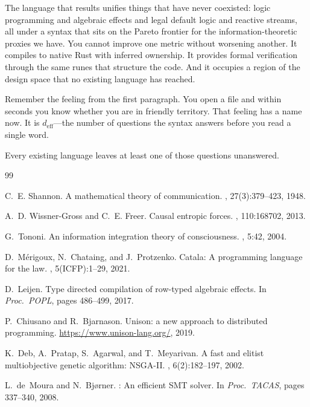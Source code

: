 \documentclass[11pt,a4paper]{article}
\newcommand{\deff}{d_{\mathrm{eff}}}
\begin{document}
The language that results unifies things that have never coexisted: logic programming and algebraic effects and legal default logic and reactive streams, all under a syntax that sits on the Pareto frontier for the information-theoretic proxies we have. You cannot improve one metric without worsening another. It compiles to native Rust with inferred ownership. It provides formal verification through the same runes that structure the code. And it occupies a region of the design space that no existing language has reached.

Remember the feeling from the first paragraph. You open a file and within seconds you know whether you are in friendly territory. That feeling has a name now. It is $\deff$---the number of questions the syntax answers before you read a single word.

Every existing language leaves at least one of those questions unanswered.

\begin{thebibliography}{99}

C.~E. Shannon.
\newblock A mathematical theory of communication.
, 27(3):379--423, 1948.

A.~D. Wissner-Gross and C.~E. Freer.
\newblock Causal entropic forces.
, 110:168702, 2013.

G.~Tononi.
\newblock An information integration theory of consciousness.
, 5:42, 2004.

D.~M\'erigoux, N.~Chataing, and J.~Protzenko.
\newblock Catala: A programming language for the law.
, 5(ICFP):1--29, 2021.

D.~Leijen.
\newblock Type directed compilation of row-typed algebraic effects.
\newblock In {\em Proc.\ POPL}, pages 486--499, 2017.

P.~Chiusano and R.~Bjarnason.
\newblock Unison: a new approach to distributed programming.
\newblock \url{https://www.unison-lang.org/}, 2019.

K.~Deb, A.~Pratap, S.~Agarwal, and T.~Meyarivan.
\newblock A fast and elitist multiobjective genetic algorithm: {NSGA-II}.
, 6(2):182--197, 2002.

L.~de~Moura and N.~Bj{\o}rner.
: An efficient {SMT} solver.
\newblock In {\em Proc.\ TACAS}, pages 337--340, 2008.

\end{thebibliography}
\end{document}
